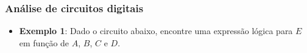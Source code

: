 \documentclass{beamer}
\begin{document}

\begin{frame}
\frametitle{Análise de circuitos digitais}

\begin{itemize}
\item \textbf{Exemplo 1}: Dado o circuito abaixo, encontre uma expressão lógica para $E$ em função de $A$, $B$, $C$ e $D$.\\[6pt]




\end{itemize}
\end{frame}
\end{document}
